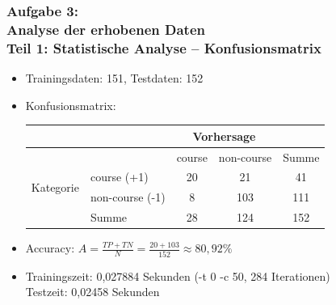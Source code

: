 \documentclass[accentcolor=tud7b,noresetcounter]{tudbeamer}
\begin{document}
	\begin{frame}
		\frametitle{Aufgabe 3:\\ Analyse der erhobenen Daten\\ Teil 1: Statistische Analyse -- Konfusionsmatrix}
		\begin{itemize}
			\item Trainingsdaten: 151, Testdaten: 152
			\item Konfusionsmatrix: \\
			\begin{tabular}{|l|l|c|c||c|}
		\hline
			& & \multicolumn{2}{c|}{Vorhersage} & \\
			\hline
			& & course & non-course & Summe \\
			\hline
		\multirow{2}{*}{Kategorie} & course (+1) & 20 & 21 & 41\\
		\cline{2-5}
		& non-course (-1) & 8 & 103 & 111\\
		\hline
		& Summe & 28 & 124 & 152 \\
		\hline
		\end{tabular}
			\item Accuracy: $A = \frac{TP + TN}{N} = \frac{20+103}{152} \approx 80,92\%$
			\item Trainingszeit: 0,027884 Sekunden (-t 0 -c 50, 284 Iterationen)\\
				Testzeit: 0,02458 Sekunden
		\end{itemize}

		

	\end{frame}
	
\end{document}
